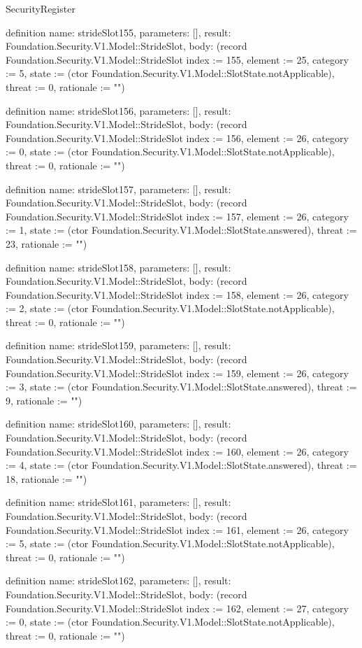 \begin{lexlean}{SecurityRegister}
\begin{semanticmodule}
definition{
  name: strideSlot155,
  parameters: [],
  result: Foundation.Security.V1.Model::StrideSlot,
  body: (record Foundation.Security.V1.Model::StrideSlot {index := 155, element := 25, category := 5, state := (ctor Foundation.Security.V1.Model::SlotState.notApplicable), threat := 0, rationale := ""})
}

definition{
  name: strideSlot156,
  parameters: [],
  result: Foundation.Security.V1.Model::StrideSlot,
  body: (record Foundation.Security.V1.Model::StrideSlot {index := 156, element := 26, category := 0, state := (ctor Foundation.Security.V1.Model::SlotState.notApplicable), threat := 0, rationale := ""})
}

definition{
  name: strideSlot157,
  parameters: [],
  result: Foundation.Security.V1.Model::StrideSlot,
  body: (record Foundation.Security.V1.Model::StrideSlot {index := 157, element := 26, category := 1, state := (ctor Foundation.Security.V1.Model::SlotState.answered), threat := 23, rationale := ""})
}

definition{
  name: strideSlot158,
  parameters: [],
  result: Foundation.Security.V1.Model::StrideSlot,
  body: (record Foundation.Security.V1.Model::StrideSlot {index := 158, element := 26, category := 2, state := (ctor Foundation.Security.V1.Model::SlotState.notApplicable), threat := 0, rationale := ""})
}

definition{
  name: strideSlot159,
  parameters: [],
  result: Foundation.Security.V1.Model::StrideSlot,
  body: (record Foundation.Security.V1.Model::StrideSlot {index := 159, element := 26, category := 3, state := (ctor Foundation.Security.V1.Model::SlotState.answered), threat := 9, rationale := ""})
}

definition{
  name: strideSlot160,
  parameters: [],
  result: Foundation.Security.V1.Model::StrideSlot,
  body: (record Foundation.Security.V1.Model::StrideSlot {index := 160, element := 26, category := 4, state := (ctor Foundation.Security.V1.Model::SlotState.answered), threat := 18, rationale := ""})
}

definition{
  name: strideSlot161,
  parameters: [],
  result: Foundation.Security.V1.Model::StrideSlot,
  body: (record Foundation.Security.V1.Model::StrideSlot {index := 161, element := 26, category := 5, state := (ctor Foundation.Security.V1.Model::SlotState.notApplicable), threat := 0, rationale := ""})
}

definition{
  name: strideSlot162,
  parameters: [],
  result: Foundation.Security.V1.Model::StrideSlot,
  body: (record Foundation.Security.V1.Model::StrideSlot {index := 162, element := 27, category := 0, state := (ctor Foundation.Security.V1.Model::SlotState.notApplicable), threat := 0, rationale := ""})
}


\end{semanticmodule}
\end{lexlean}
